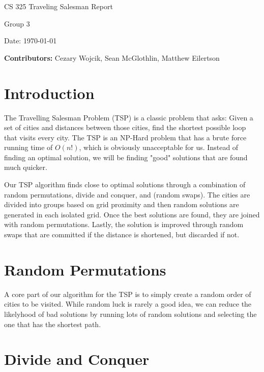 \documentclass[12pt,letterpaper]{article}
\begin{document}
\begin{titlepage}
    \vspace*{4cm}
    {\huge \center
        CS 325 Traveling Salesman Report\\[1cm]
    }
    \center
    {\large
        Group 3

        Date: \today

    \textbf{Contributors:}
    Cezary Wojcik,
    Sean McGlothlin,
    Matthew Eilertson
    }

\end{titlepage}

\section*{Introduction}

The Travelling Salesman Problem (TSP) is a classic problem that asks: Given a set of cities and distances between those cities, find the shortest possible loop that visits every city. The TSP is an NP-Hard problem that has a brute force running time of $O(n!)$, which is obviously unacceptable for us. Instead of finding an optimal solution, we will be finding "good" solutions that are found much quicker.

Our TSP algorithm finds close to optimal solutions through a combination of random permutations, divide and conquer, and (random swaps). The cities are divided into groups based on grid proximity and then random solutions are generated in each isolated grid. Once the best solutions are found, they are joined with random permutations. Lastly, the solution is improved through random swaps that are committed if the distance is shortened, but discarded if not.



\section*{Random Permutations}

A core part of our algorithm for the TSP is to simply create a random order of cities to be visited. While random luck is rarely a good idea, we can reduce the likelyhood of bad solutions by running lots of random solutions and selecting the one that has the shortest path. 


\section*{Divide and Conquer}
\end{document}
